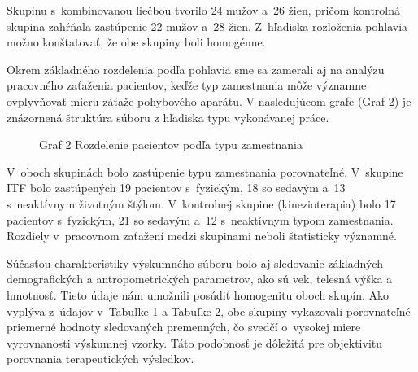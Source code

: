 Skupinu s~kombinovanou liečbou tvorilo 24 mužov a~26 žien, pričom kontrolná skupina zahŕňala zastúpenie 22 mužov a~28 žien. Z~hľadiska rozloženia pohlavia možno konštatovať, že obe skupiny boli homogénne.

Okrem základného rozdelenia podľa pohlavia sme sa zamerali aj na analýzu pracovného zaťaženia pacientov, keďže typ zamestnania môže významne ovplyvňovať mieru záťaže pohybového aparátu. V nasledujúcom grafe (Graf 2) je znázornená štruktúra súboru z hľadiska typu vykonávanej práce.

\begin{figure}[H]
    \centering
    \caption*{Graf 2 Rozdelenie pacientov podľa typu zamestnania}
    \label{fig:zamestnanie}
\end{figure}

V~oboch skupinách bolo zastúpenie typu zamestnania porovnateľné. V~skupine ITF bolo zastúpených 19 pacientov s~fyzickým, 18 so sedavým a~13 s~neaktívnym životným štýlom. V~kontrolnej skupine (kinezioterapia) bolo 17 pacientov s~fyzickým, 21 so sedavým a~12 s~neaktívnym typom zamestnania. Rozdiely v~pracovnom zaťažení medzi skupinami neboli štatisticky významné.

Súčasťou charakteristiky výskumného súboru bolo aj sledovanie základných demografických a antropometrických parametrov, ako sú vek, telesná výška a hmotnosť. Tieto údaje nám umožnili posúdiť homogenitu oboch skupín. Ako vyplýva z~údajov v~Tabuľke 1 a Tabuľke 2, obe skupiny vykazovali porovnateľné priemerné hodnoty sledovaných premenných, čo svedčí o~vysokej miere vyrovnanosti výskumnej vzorky. Táto podobnosť je dôležitá pre objektivitu porovnania terapeutických výsledkov.

